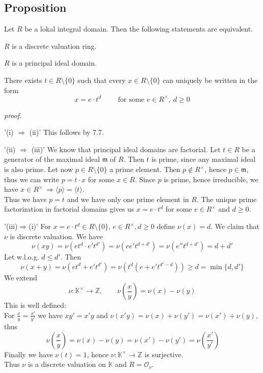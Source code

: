 \documentclass[12pt]{book}
\begin{document}
\begin{spacing}{1.3}
\subsection{Proposition} %
Let $R$ be a lokal integral domain. Then the following statements are equivalent.
\begin{compactenum}
\item $R$ is a discrete valuation ring.
\item $R$ is a principal ideal domain.
\item There exists $t \in R\setminus \{0\}$ such that every $x \in R \setminus \{0\}$ can uniquely be written in the form $$x=e \cdot t^d \qquad \textrm{ for some } e \in R^{\times}, \ d \geqslant 0$$
\end{compactenum}
\textit{proof.}
\begin{compactitem}
\item['(i) $\Rightarrow$ (ii)'] This follows by 7.7.
\item['(ii) $\Rightarrow$ (iii)'] We know that principal ideal domains are factorial. Let $t \in R$ be a generator of the maximal ideal $\mathfrak{m}$ of $R$. Then $t$ is prime, since any maximal ideal is also prime. Let now $p \in R\setminus \{0\}$ a prime element. Then $p \notin R^{\times}$, hence $p \in \mathfrak{m}$, thus we can write $p=t \cdot x$ for some $x \in R$.  Since $p$ is prime, hence irreducible, we have $x \in R^{\times} \ \Rightarrow \langle p \rangle = \langle t \rangle$.\\
Thus we have $p=t$ and we have only one prime element in $R$. The unique prime factorization in factorial domains gives us $x= e \cdot t^d$ for some $ e \in R^{\times}$ and $d \geqslant 0$. 
\item['(iii)$\Rightarrow$(i)'] For $x= e \cdot t^d \in R \setminus \{0\}$, $e \in R^{\times}, d \geqslant 0$ define $\nu(x)=d$. 
We claim that $\nu$ is discrete valuation. We have
$$\nu(xy)=\nu\left( e t^d \cdot e' t^{d'}\right)=\nu\left(ee't^{d+d'}\right)=\nu\left(e''t^{d+d'}\right)=d+d'$$
Let w.l.o.g. $d \leqslant d'$. Then
$$\nu(x+y)=\nu\left(et^d+e't^{d'}\right) = \nu \left(t^d \left(e+e' t^{d'-d}\right)\right) \geqslant d = \min\{d,d'\}$$
We extend $$\nu: \mathbb{K}^{\times} \longrightarrow \mathbb{Z},  \qquad \nu\left(\frac{x}{y}\right)=\nu(x)-\nu(y)$$ This is well defined:\\
For $\frac{x}{y}=\frac{x'}{y'}$ we have $xy'=x'y$ and $\nu(x'y)=\nu(x)+\nu(y')=\nu(x')+\nu(y)$, thus  $$\ \nu\left(\frac{x}{y}\right)=\nu(x)-\nu(y)=\nu(x')-\nu(y')=\nu\left(\frac{x'}{y'}\right)$$
Finally we have $\nu(t)=1$, hence $\nu:\mathbb{K}^{\times} \longrightarrow \mathbb{Z}$ is surjective.\\
Thus $\nu$ is a discrete valuation on $\mathbb{K}$ and $R=\mathcal{O}_{\nu}$. 
\end{compactitem}


\end{spacing}
\end{document}
